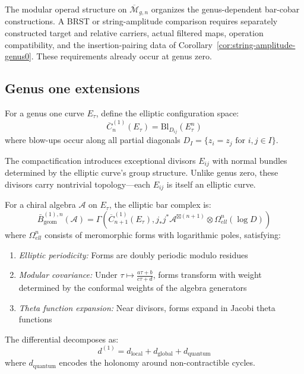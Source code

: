 

The modular operad structure on $\overline{\mathcal M}_{g,n}$ organizes the genus-dependent bar-cobar constructions.
A BRST or string-amplitude comparison requires separately constructed target and relative carriers, actual filtered maps, operation compatibility, and the insertion-pairing data of Corollary~\ref{cor:string-amplitude-genus0}.
These requirements already occur at genus zero.

\subsection{Genus one extensions}\label{subsec:elliptic}

\begin{definition}\label{def:elliptic-config}
For a genus one curve $E_\tau$, define the elliptic configuration space:
\[\overline{C}_n^{(1)}(E_\tau) = \mathrm{Bl}_{D_{ij}}(E_\tau^n)\]
where blow-ups occur along all partial diagonals $D_I = \{z_i = z_j \text{ for } i,j \in I\}$.

The compactification introduces exceptional divisors $E_{ij}$ with normal bundles determined by the elliptic curve's group structure. Unlike genus zero, these divisors carry nontrivial topology---each $E_{ij}$ is itself an elliptic curve.
\end{definition}

\begin{theorem}\label{thm:elliptic-bar}
For a chiral algebra $\mathcal{A}$ on $E_\tau$, the elliptic bar complex is:
\[\bar{B}^{(1),n}_{\text{geom}}(\mathcal{A}) = \Gamma\left(\overline{C}_{n+1}^{(1)}(E_\tau), j_*j^*\mathcal{A}^{\boxtimes(n+1)} \otimes \Omega^n_{ell}(\log D)\right)\]
where $\Omega^n_{ell}$ consists of meromorphic forms with logarithmic poles, satisfying:
\begin{enumerate}
\item \emph{Elliptic periodicity:} Forms are doubly periodic modulo residues
\item \emph{Modular covariance:} Under $\tau \mapsto \frac{a\tau + b}{c\tau + d}$, forms transform with weight determined by the conformal weights of the algebra generators
\item \emph{Theta function expansion:} Near divisors, forms expand in Jacobi theta functions
\end{enumerate}

The differential decomposes as:
\[d^{(1)} = d_{\text{local}} + d_{\text{global}} + d_{\text{quantum}}\]
where $d_{\text{quantum}}$ encodes the holonomy around non-contractible cycles.
\end{theorem}


